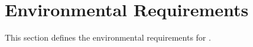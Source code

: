 \KNEADSECTIONNEWPAGE
\section{Environmental Requirements}
\label{lab:sec_Environmental}


This section defines the environmental requirements for \ThisSys.

